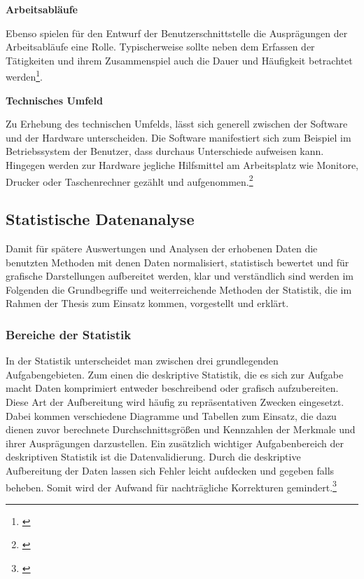 \textbf{Arbeitsabläufe}

Ebenso spielen für den Entwurf der Benutzerschnittstelle die Ausprägungen der Arbeitsabläufe eine Rolle. Typischerweise sollte neben dem Erfassen der Tätigkeiten und ihrem Zusammenspiel auch die Dauer und Häufigkeit betrachtet werden\footnote{\cite[vgl.][28]{Ecker2016}}.

\textbf{Technisches Umfeld}

Zu Erhebung des technischen Umfelds, lässt sich generell zwischen der Software und der Hardware unterscheiden. Die Software manifestiert sich zum Beispiel im Betriebssystem der Benutzer, dass durchaus Unterschiede aufweisen kann. Hingegen werden zur Hardware jegliche Hilfsmittel am Arbeitsplatz wie Monitore, Drucker oder Taschenrechner gezählt und aufgenommen.\footnote{\cite[vgl.][28]{Ecker2016}}


\subsection{Statistische Datenanalyse}
Damit für spätere Auswertungen und Analysen der erhobenen Daten die benutzten Methoden mit denen Daten normalisiert, statistisch bewertet und für grafische Darstellungen aufbereitet werden, klar und verständlich sind werden im Folgenden die Grundbegriffe und weiterreichende Methoden der Statistik, die im Rahmen der Thesis zum Einsatz kommen, vorgestellt und erklärt.


\subsubsection{Bereiche der Statistik}
In der Statistik unterscheidet man zwischen drei grundlegenden Aufgabengebieten. Zum einen die deskriptive Statistik, die es sich zur Aufgabe macht Daten komprimiert entweder beschreibend oder grafisch aufzubereiten. Diese Art der Aufbereitung wird häufig zu repräsentativen Zwecken eingesetzt. Dabei kommen verschiedene Diagramme und Tabellen zum Einsatz, die dazu dienen zuvor berechnete Durchschnittsgrößen und Kennzahlen der Merkmale und ihrer Ausprägungen darzustellen. Ein zusätzlich wichtiger Aufgabenbereich der deskriptiven Statistik ist die Datenvalidierung. Durch die deskriptive Aufbereitung der Daten lassen sich Fehler leicht aufdecken und gegeben falls beheben. Somit wird der Aufwand für nachträgliche Korrekturen gemindert.\footnote{\cite[vgl.][10\psq]{Statistik2016}}

